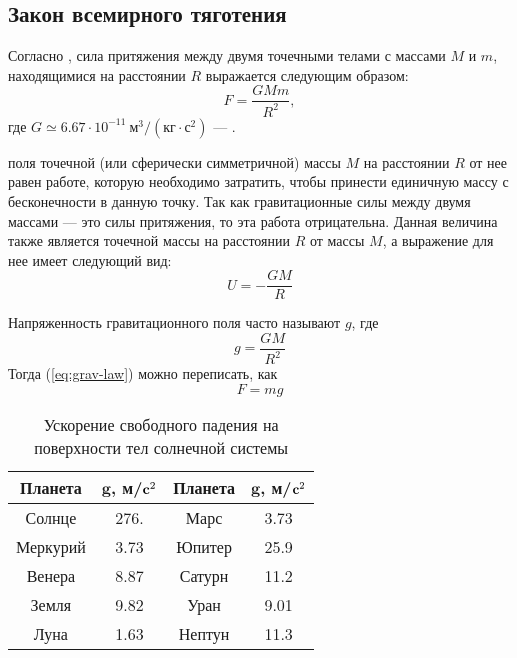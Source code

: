 \subsection{Закон всемирного тяготения}
Согласно , сила притяжения 
между двумя точечными телами с массами $M$ и $m$,
находящимися на расстоянии $R$ выражается следующим
образом:\begin{equation}
	F=\frac{GMm}{R^2}, \label{eq:grav-law}
\end{equation}
где $G\simeq 6.67\cdot 10^{-11}~\text{м}^3 / 
\left( \text{кг} \cdot \text{с}^2 \right)$ --- 
.

 поля точечной (или сферически 
симметричной) массы $M$ на расстоянии $R$ от нее равен
работе, которую необходимо затратить, чтобы принести
единичную массу с бесконечности в данную точку. Так как
гравитационные силы между двумя массами --- это силы 
притяжения, то эта работа отрицательна. Данная
величина также является  точечной
массы на расстоянии $R$ от массы $M$, а выражение для нее имеет 
следующий вид:\begin{equation}
U=-\frac{GM}{R}
\end{equation}

Напряженность гравитационного поля часто называют 
 $g$, где\begin{equation}
	g = \frac{GM}{R^2}
\end{equation}
Тогда (\ref{eq:grav-law}) можно переписать, как \begin{equation}
	F = mg
\end{equation}
\begin{table}[h!]
\centering
\begin{tabular}{|c|c|c|c|}
\hline 
{\bfseries Планета} & $\mathbf{g}$, 
{\bfseries м/$\text{\bfseries c}^2$} 
& {\bfseries Планета} & $\mathbf{g}$, 
{\bfseries м/$\text{\bfseries c}^2$}\\
\hline
Солнце & 276. & Марс & 3.73\\
\hline
Меркурий & 3.73 & Юпитер & 25.9\\
\hline
Венера & 8.87 & Сатурн & 11.2\\
\hline
Земля & 9.82 & Уран & 9.01\\
\hline
Луна & 1.63 & Нептун & 11.3\\
\hline
\end{tabular}
\caption{Ускорение свободного падения на поверхности тел 
солнечной системы}
\end{table}
